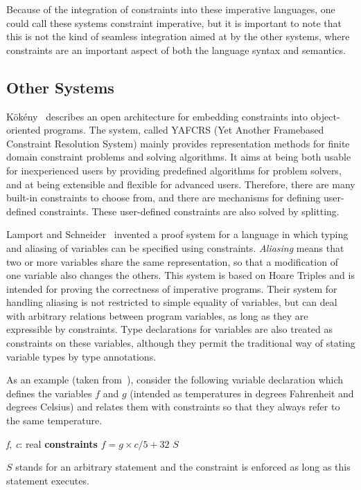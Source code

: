 Because of the integration of constraints into these imperative
languages, one could call these systems constraint imperative, but it
is important to note that this is not the kind of seamless integration
aimed at by the other systems, where constraints are an important
aspect of both the language syntax and semantics.


\subsection{Other Systems}


K\"ok\'eny~\cite{ny94yet} describes an open architecture for embedding
constraints into object-oriented programs.  The system, called YAFCRS
(Yet Another Framebased Constraint Resolution System) mainly provides
representation methods for finite domain constraint problems and
solving algorithms.  It aims at being both usable for inexperienced
users by providing predefined algorithms for problem solvers, and at
being extensible and flexible for advanced users.  Therefore, there
are many built-in constraints to choose from, and there are mechanisms
for defining user-defined constraints.  These user-defined constraints
are also solved by splitting.


Lamport and Schneider~\cite{lamport84aliasing} invented a proof system
for a language in which typing and aliasing of variables can be
specified using constraints.  {\em Aliasing} means that two or more
variables share the same representation, so that a modification of one
variable also changes the others.  This system is based on Hoare
Triples and is intended for proving the correctness of imperative
programs.  Their system for handling aliasing is not restricted to
simple equality of variables, but can deal with arbitrary relations
between program variables, as long as they are expressible by
constraints.  Type declarations for variables are also treated as
constraints on these variables, although they permit the traditional
way of stating variable types by type annotations.

As an example (taken from~\cite{lamport84aliasing}), consider the
following variable declaration which defines the variables $f$ and $g$
(intended as temperatures in degrees Fahrenheit and degrees Celsius)
and relates them with constraints so that they always refer to the
same temperature.
%
\begin{ttlprog}
\>\ttlVar{} {\em f}, {\em c}: real {\bf constraints} $f=g\times c/5+32$ \ttlIn{} $S$
\end{ttlprog}
%
$S$ stands for an arbitrary statement and the constraint is enforced
as long as this statement executes.

